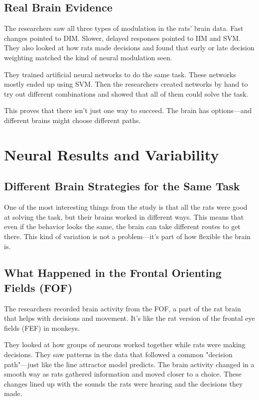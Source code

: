 \documentclass{article}
\begin{document}
\subsection{Real Brain Evidence}
The researchers saw all three types of modulation in the rats’ brain data. Fast changes pointed to DIM. Slower, delayed responses pointed to IIM and SVM. They also looked at how rats made decisions and found that early or late decision weighting matched the kind of neural modulation seen.

They trained artificial neural networks to do the same task. These networks mostly ended up using SVM. Then the researchers created networks by hand to try out different combinations and showed that all of them could solve the task.

This proves that there isn’t just one way to succeed. The brain has options—and different brains might choose different paths.


\section{Neural Results and Variability}

\subsection{Different Brain Strategies for the Same Task}
One of the most interesting things from the study is that all the rats were good at solving the task, but their brains worked in different ways. This means that even if the behavior looks the same, the brain can take different routes to get there. This kind of variation is not a problem—it’s part of how flexible the brain is.

\subsection{What Happened in the Frontal Orienting Fields (FOF)}
The researchers recorded brain activity from the FOF, a part of the rat brain that helps with decisions and movement. It's like the rat version of the frontal eye fields (FEF) in monkeys.

They looked at how groups of neurons worked together while rats were making decisions. They saw patterns in the data that followed a common "decision path"—just like the line attractor model predicts. The brain activity changed in a smooth way as rats gathered information and moved closer to a choice. These changes lined up with the sounds the rats were hearing and the decisions they made.
\end{document}
